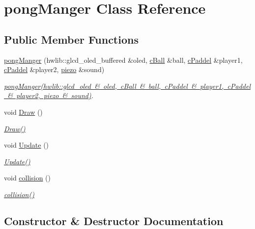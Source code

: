 \hypertarget{classpong_manger}{}\section{pong\+Manger Class Reference}
\label{classpong_manger}
\subsection*{Public Member Functions}
\begin{DoxyCompactItemize}
\item 
\mbox{\hyperlink{classpong_manger_a0d8a1d1247ef0659c82f1cba9d024295}{pong\+Manger}} (hwlib\+::glcd\+\_\+oled\+\_\+buffered \&oled, \mbox{\hyperlink{classc_ball}{c\+Ball}} \&ball, \mbox{\hyperlink{classc_paddel}{c\+Paddel}} \&player1, \mbox{\hyperlink{classc_paddel}{c\+Paddel}} \&player2, \mbox{\hyperlink{classpiezo}{piezo}} \&sound)
\begin{DoxyCompactList}\small\item\em \mbox{\hyperlink{classpong_manger}{pong\+Manger(hwlib\+::glcd\+\_\+oled  \& oled, c\+Ball \& ball, c\+Paddel \& player1, c\+Paddel \& player2, piezo \& sound)}}. \end{DoxyCompactList}\item 
void \mbox{\hyperlink{classpong_manger_a2c2c6e7f024261d5b3e3f4b85abb060a}{Draw}} ()
\begin{DoxyCompactList}\small\item\em \mbox{\hyperlink{classpong_manger_a2c2c6e7f024261d5b3e3f4b85abb060a}{Draw()}} \end{DoxyCompactList}\item 
void \mbox{\hyperlink{classpong_manger_a878b50d69f98eb0de013269fbf9b0ead}{Update}} ()
\begin{DoxyCompactList}\small\item\em \mbox{\hyperlink{classpong_manger_a878b50d69f98eb0de013269fbf9b0ead}{Update()}} \end{DoxyCompactList}\item 
void \mbox{\hyperlink{classpong_manger_a177da6a9f5120dc153b8f33d8e6bebc3}{collision}} ()
\begin{DoxyCompactList}\small\item\em \mbox{\hyperlink{classpong_manger_a177da6a9f5120dc153b8f33d8e6bebc3}{collision()}} \end{DoxyCompactList}\end{DoxyCompactItemize}


\subsection{Constructor \& Destructor Documentation}
\mbox{\label{classpong_manger_a0d8a1d1247ef0659c82f1cba9d024295}} 
